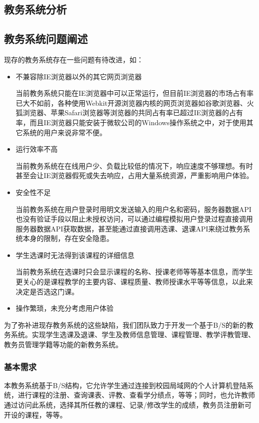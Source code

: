 \begin{center}
  \section{教务系统分析}
\end{center}


\subsection{教务系统问题阐述}
现存的教务系统存在一些问题有待改进，如：

\begin{itemize}
  \item 不兼容除IE浏览器以外的其它网页浏览器
  
  \CJKindent 当前教务系统只能在IE浏览器中可以正常运行，但目前IE浏览器的市场占有率已大不如前，各种使用Webkit开源浏览器内核的网页浏览器如谷歌浏览器、火狐浏览器、苹果Safari浏览器等浏览器的共同占有率已超过IE浏览器的占有率，而且IE浏览器只能安装于微软公司的Windows操作系统\texttrademark 之中，对于使用其它系统的用户来说非常不便。
  
  \item 运行效率不高
  
  \CJKindent 当前教务系统在在线用户少、负载比较低的情况下，响应速度不够理想。有时甚至会让IE浏览器假死或失去响应，占用大量系统资源，严重影响用户体验。
  
  \item 安全性不足
  
  \CJKindent 当前教务系统在用户登录时用明文发送输入的用户名和密码，服务器数据API也没有验证手段以阻止未授权访问，可以通过编程模拟用户登录过程直接调用服务器数据API获取数据，甚至能通过直接调用选课、退课API来绕过教务系统本身的限制，存在安全隐患。
  
  \item 学生选课时无法得到该课程的详细信息
  
  \CJKindent 当前教务系统在选课时只会显示课程的名称、授课老师等等基本信息，而学生更关心的是课程教学的主要内容、课程质量、教师授课水平等等信息，以此来决定是否选这门课。
  
  \item 操作繁琐，未充分考虑用户体验
\end{itemize}

为了弥补进现存教务系统的这些缺陷，我们团队致力于开发一个基于B/S的新的教务系统。实现学生选课及退课、学生及教师信息管理、课程管理、教学评教管理、教务员管理学籍等功能的新教务系统。

\subsubsection{基本需求}
本教务系统基于B/S结构，它允许学生通过连接到校园局域网的个人计算机登陆系统，进行课程的注册、查询课表、评教、查看学分绩点，等等；同时，也允许教师通过访问此系统，选择其所任教的课程、记录/修改学生的成绩，教务员注册新可开设的课程，等等。

